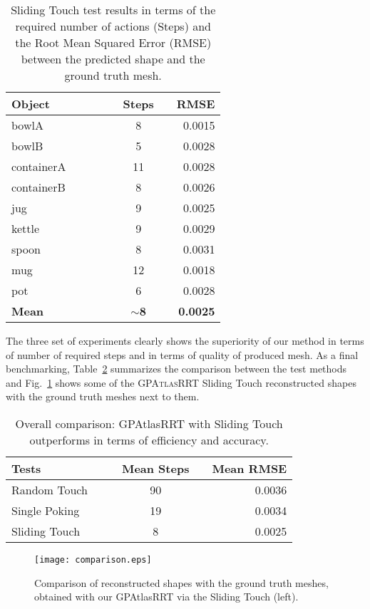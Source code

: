 \begin{table}
    \centering
    \begin{tabularx}{0.95\columnwidth}{lccccccr}
        \toprule
        Object & & &&& Steps && RMSE \\
        \midrule
        bowlA &&& & &8 && 0.0015\\
        bowlB & &&& &5 && 0.0028\\
        containerA &&&&& 11 && 0.0028\\
        containerB &&&&& 8 && 0.0026\\
        jug &&&&& 9 && 0.0025\\
        kettle &&&&& 9 && 0.0029\\
        spoon &&&&& 8 && 0.0031\\
        mug &&&&& 12 && 0.0018\\
        pot &&&&& 6 && 0.0028\\
        \midrule
        \textbf{Mean} &&&&& $\sim$\textbf{8} && \textbf{0.0025}\\
        \bottomrule
    \end{tabularx}
    \caption{Sliding Touch test results in terms of the required
    number of actions (Steps) and the Root Mean Squared Error (RMSE) between
    the predicted shape and the ground truth mesh.}
    \label{tab:test3}
\end{table}

The three set of experiments clearly shows the superiority of our method in terms of number of required steps
and in terms of quality of produced mesh. As a final benchmarking, Table~\ref{tab:comp} summarizes the comparison
between the test methods and Fig.~\ref{fig:shapecomp} shows some  of the \textsc{GPAtlasRRT} Sliding Touch reconstructed shapes with
the ground truth meshes next to them.
\begin{table}
    \centering
    \begin{tabularx}{0.95\columnwidth}{lccccr}
        \toprule
        Tests  &&& Mean Steps && Mean RMSE \\
        \midrule
        Random Touch & & &90 && 0.0036\\
        Single Poking && &19 && 0.0034\\
        Sliding Touch &&& 8 && 0.0025\\
        \bottomrule
    \end{tabularx}
    \caption{Overall comparison: GPAtlasRRT with Sliding Touch outperforms in terms
    of efficiency and accuracy.}
    \label{tab:comp}
\end{table}
\begin{figure}[htb]
    \centering
    \texttt{[image: comparison.eps]}
    \caption{Comparison of reconstructed shapes with the ground truth meshes, obtained with our GPAtlasRRT via the Sliding Touch (left).}
    \label{fig:shapecomp}
\end{figure}


